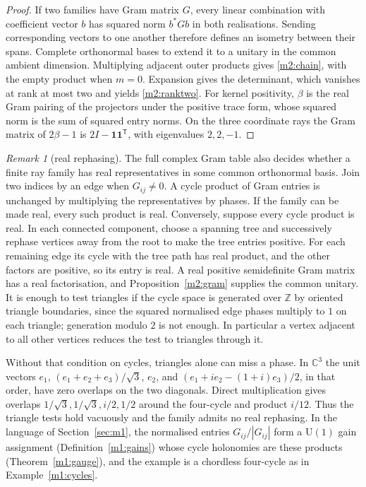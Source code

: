 \documentclass[11pt,reqno]{amsart}
\theoremstyle{definition}
\theoremstyle{remark}
\newtheorem{remark}[theorem]{Remark}
\numberwithin{equation}{section}
\newcommand{\C}{\mathbb{C}}
\newcommand{\Z}{\mathbb{Z}}
\begin{document}
\begin{proof}
If two families have Gram matrix $G$, every linear combination with coefficient vector $b$ has squared norm $b^*Gb$ in both realisations.
Sending corresponding vectors to one another therefore defines an isometry between their spans.  Complete orthonormal bases to extend it to
a unitary in the common ambient dimension.  Multiplying adjacent outer products gives \eqref{m2:chain}, with the empty product when $m=0$.
Expansion gives the determinant, which vanishes at rank at most two and yields \eqref{m2:ranktwo}.  For kernel positivity, $\beta$ is the
real Gram pairing of the projectors under the positive trace form, whose squared norm is the sum of squared entry norms.  On the three
coordinate rays the Gram matrix of $2\beta-1$ is $2I-\mathbf 1\mathbf 1^{\mathsf T}$, with eigenvalues $2,2,-1$.
\end{proof}

\begin{remark}[real rephasing]\label{m2:rephasing}
The full complex Gram table also decides whether a finite ray family has real representatives in some common orthonormal basis.  Join two
indices by an edge when $G_{ij}\ne0$.  A cycle product of Gram entries is unchanged by multiplying the representatives by phases.  If the
family can be made real, every such product is real.  Conversely, suppose every cycle product is real.  In each connected component, choose
a spanning tree and successively rephase vertices away from the root to make the tree entries positive.  For each remaining edge its cycle
with the tree path has real product, and the other factors are positive, so its entry is real.  A real positive semidefinite Gram matrix
has a real factorisation, and Proposition~\ref{m2:gram} supplies the common unitary.  It is enough to test triangles if the cycle space is
generated over $\Z$ by oriented triangle boundaries, since the squared normalised edge phases multiply to $1$ on each triangle; generation
modulo $2$ is not enough.  In particular a vertex adjacent to all other vertices reduces the test to triangles through it.

Without that condition on cycles, triangles alone can miss a phase.  In $\C^3$ the unit vectors $e_1$, $(e_1+e_2+e_3)/\sqrt3$, $e_2$, and
$(e_1+ie_2-(1+i)e_3)/2$, in that order, have zero overlaps on the two diagonals.  Direct multiplication gives overlaps
$1/\sqrt3,1/\sqrt3,i/2,1/2$ around the four-cycle and product $i/12$.  Thus the triangle tests hold vacuously and the family admits no real
rephasing.  In the language of Section~\ref{sec:m1}, the normalised entries $G_{ij}/|G_{ij}|$ form a $\mathrm U(1)$ gain
assignment (Definition~\ref{m1:gains}) whose cycle holonomies are these products (Theorem~\ref{m1:gauge}), and the example is a chordless
four-cycle as in Example~\ref{m1:cycles}.
\end{remark}
\end{document}
